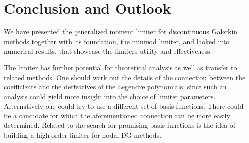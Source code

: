 \section{Conclusion and Outlook}
\label{sec:conclusion}

We have presented the generalized moment limiter for discontinuous Galerkin methods together with its foundation, the minmod limiter, and looked into numerical results, that showcase the limiters utility and effectiveness.

The limiter has further potential for theoretical analysis as well as transfer to related methods.
One should work out the details of the connection between the coefficients and the derivatives of the Legendre polynomials, since such an analysis could yield more insight into the choice of limiter parameters.
Alternatively one could try to use a different set of basis functions.
There could be a candidate for which the aforementioned connection can be more easily determined.
Related to the search for promising basis functions is the idea of building a high-order limiter for nodal DG methods.
